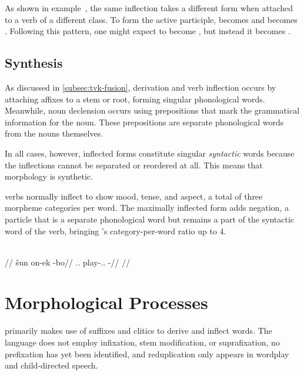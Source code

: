 As shown in example~, the same inflection takes a different form when attached to a verb of a different class. To form the active participle,  becomes  and  becomes . Following this pattern, one might expect  to become \ungr{}, but instead it becomes .


\subsection{Synthesis}
\label{subsec:tvk-synthesis}

As discussed in \autoref{subsec:tvk-fusion}, derivation and verb inflection occurs by attaching affixes to a stem or root, forming singular phonological words. Meanwhile, noun declension occurs using prepositions that mark the grammatical information for the noun. These prepositions are separate phonological words from the nouns themselves.

In all cases, however, inflected forms constitute singular \emph{syntactic} words because the inflections cannot be separated or reordered at all. This means that \langtvk{} morphology is synthetic\autocite{wals-22}.

\langtvk{} verbs normally inflect to show mood, tense, and aspect, a total of three morpheme categories per word. The maximally inflected form adds negation, a particle that is a separate phonological word but remains a part of the syntactic word of the verb, bringing \langtvk's category-per-word ratio up to 4\autocite{wals-22}.

	\begingl
		\glpreamble{}\\
		//
		\gla šun on-ek -bo//
		\glb \Tps.\An.\Top{} play-\Ind.\Pst.\Pfv{} -\Neg//
		\glft {}//
	\endgl
\xe



\section{Morphological Processes}
\label{sec:tvk-processes}

\langtvk{} primarily makes use of suffixes and clitics to derive and inflect words. The language does not employ infixation, stem modification, or suprafixation, no prefixation has yet been identified, and reduplication only appears in wordplay and child-directed speech.

